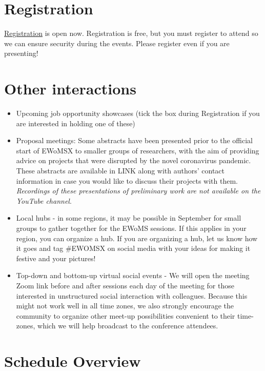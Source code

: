 \documentclass[
  12pt,
]{book}
\begin{document}
\hypertarget{registration}{%
\section{Registration}\label{registration}}

\href{https://cardiffunipsych.eu.qualtrics.com/jfe/form/SV_0VYX845gbq54Arr}{Registration} is open now. Registration is free, but you must register to attend so we can ensure security during the events. Please register even if you are presenting!

\hypertarget{other-interactions}{%
\section{Other interactions}\label{other-interactions}}

\begin{itemize}
\item
  Upcoming job opportunity showcases (tick the box during Registration if you are interested in holding one of these)
\item
  Proposal meetings: Some abstracts have been presented prior to the official start of EWoMSX to smaller groups of researchers, with the aim of providing advice on projects that were disrupted by the novel coronavirus pandemic. These abstracts are available in LINK along with authors' contact information in case you would like to discuss their projects with them. \emph{Recordings of these presentations of preliminary work are not available on the YouTube channel}.
\item
  Local hubs - in some regions, it may be possible in September for small groups to gather together for the EWoMS sessions. If this applies in your region, you can organize a hub. If you are organizing a hub, let us know how it goes and tag \#EWOMSX on social media with your ideas for making it festive and your pictures!
\item
  Top-down and bottom-up virtual social events - We will open the meeting Zoom link before and after sessions each day of the meeting for those interested in unstructured social interaction with colleagues. Because this might not work well in all time zones, we also strongly encourage the community to organize other meet-up possibilities convenient to their time-zones, which we will help broadcast to the conference attendees.
\end{itemize}

\hypertarget{schedule-overview}{%
\section{Schedule Overview}\label{schedule-overview}}
\end{document}
